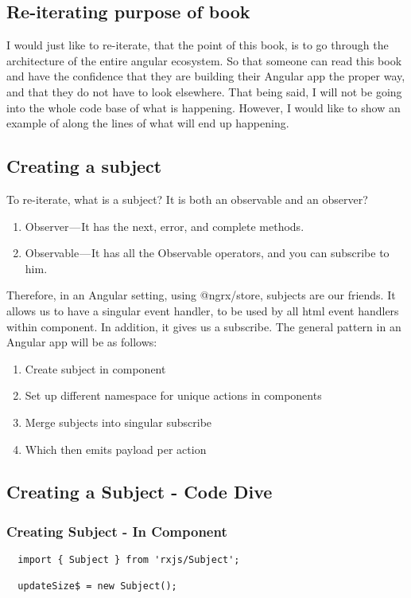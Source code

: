 \subsection{ Re-iterating purpose of book }

I would just like to re-iterate, that the point of this book, is to go through
the architecture of the entire angular ecosystem. So that someone can read this
book and have the confidence that they are building their Angular app the proper
way, and that they do not have to look elsewhere. That being said, I will not be
going into the whole code base of what is happening. However, I would like to show
an example of along the lines of what will end up happening.

\subsection{ Creating a subject }

To re-iterate, what is a subject? It is both an observable and an observer?
\begin{enumerate}
  \item Observer — It has the next, error, and complete methods.
  \item Observable — It has all the Observable operators, and you can subscribe
  to him.
\end{enumerate}

Therefore, in an Angular setting, using @ngrx/store, subjects are our friends. It
allows us to have a singular event handler, to be used by all html event handlers
within component. In addition, it gives us a subscribe. The general pattern in
an Angular app will be as follows:
\begin{enumerate}
  \item Create subject in component
  \item Set up different namespace for unique actions in components
  \item Merge subjects into singular subscribe
  \item Which then emits payload per action
\end{enumerate}

\subsection{ Creating a Subject - Code Dive }

\subsubsection{ Creating Subject - In Component }
\begin{lstlisting}
  import { Subject } from 'rxjs/Subject';

  updateSize$ = new Subject();
\end{lstlisting}

